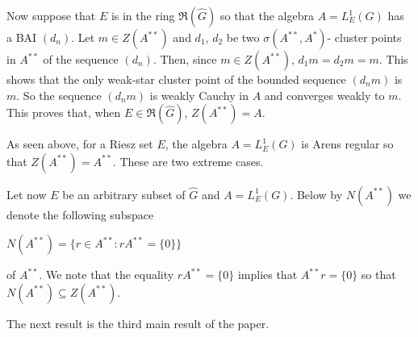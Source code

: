 \documentclass[12pt, twoside, leqno]{article}
\theoremstyle{definition}
\theoremstyle{definition}
\numberwithin{equation}{section}
\begin{document}
Now suppose that $ E $ is in the ring $ \Re(\hat{G}) $ so that the algebra $ A=L^{1}_{E}(G) $ has a BAI $ (d_{n}) $. Let $ m\in Z(A^{**}) $ and $ d_{1} $,  $ d_{2} $ be two $ \sigma(A^{**},A^{*}) $- cluster points in $ A^{**} $ of the sequence $ (d_{n}) $. Then, since $ m\in Z(A^{**}) $, $ d_{1}m=d_{2}m=m $. This shows that the only weak-star cluster point of the bounded sequence $ (d_{n}m) $ is $ m $. So the sequence $ (d_{n}m) $ is weakly Cauchy in $ A $ and converges weakly to $ m $. This proves that, when $ E\in \Re(\hat{G}) $, $ Z(A^{**})=A $.\vspace{2mm}

As seen above, for a Riesz set $ E $, the algebra $ A=L^{1}_{E}(G) $ is Arens regular so that  $ Z(A^{**})=A^{**} $. These are two extreme cases.\vspace{2mm}

Let now $ E $ be an arbitrary subset of $ \hat{G} $ and $ A=L^{1}_{E}(G) $. Below by $ N(A^{**}) $ we denote the following subspace\vspace{2mm}

$ N(A^{**})=\{r\in A^{**}:rA^{**}=\{0\}\} $\vspace{2mm}

\noindent of $ A^{**} $. We note that the equality $ rA^{**}=\{0\} $ implies that $ A^{**}r=\{0\} $ so that $ N(A^{**})\subseteq Z(A^{**}) $.\vspace{2mm}

 The next result is the third main result of the paper. \vspace{2mm}
\end{document}
